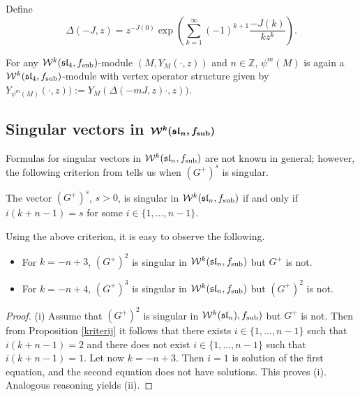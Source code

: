 Define
 \[
 \Delta (-J,z) = z^{-J(0)}\exp \left ( \sum _{k=1} ^{\infty} (-1)^{k+1}\frac{-J(k)}{kz^k}\right ).
 \]

For any $\mathcal{W}^k(\mathfrak{sl}_4, f_{\rm sub})$-module $(M, Y_M(\cdot, z))$ and $n \in \mathbb{Z}$,
$\psi^m (M)$ is again a $\mathcal{W}^k(\mathfrak{sl}_4, f_{\rm sub})$-module with vertex operator structure given by
$ Y_{\psi^m (M) } ( \cdot , z)) := Y_{ M } (\Delta ( -m J, z) \cdot , z))$.

\subsection[Singular vectors in W\^{}k(sl\_n, f\_sub)]{Singular vectors in $\boldsymbol{\mathcal{W}^k(\mathfrak{sl}_n, f_{\rm sub})}$}
	
	Formulas for singular vectors in $\mathcal{W}^k(\mathfrak{sl}_n, f_{\rm sub})$ are not known in general; however, the following criterion from \cite{Feh} tells us when $(G^+)^s$ is singular.
	
	\begin{Proposition}\label{kriterij}
		The vector $(G^+)^s$, $s>0$, is singular in $\mathcal{W}^k(\mathfrak{sl}_n, f_{\rm sub})$ if and only if~${
		 	i(k+n-1)=s}
$
 for some $i \in \{1,\dots ,n-1 \}$.
	\end{Proposition}

Using the above criterion, it is easy to observe the following.
	\begin{Lemma} \label{sing_G^+}\qquad
	\begin{itemize}\itemsep=0pt
		\item[$(i)$] For $k=-n+3$, $(G^+)^2$ is singular in $\mathcal{W}^k(\mathfrak{sl}_n, f_{\rm sub})$ but $G^+$ is not.
		\item[$(ii)$] For $k=-n+4$, $(G^+)^3$ is singular in $\mathcal{W}^k(\mathfrak{sl}_n, f_{\rm sub})$ but $(G^+)^2$ is not.	
	\end{itemize}
	\end{Lemma}
	
	\begin{proof}
		(i) Assume that $(G^+)^2$ is singular in $\mathcal{W}^k(\mathfrak{sl}_n), f_{\rm sub})$ but $G^+$ is not. Then from Proposition \ref{kriterij} it follows that there exists $i \in \{1,\dots ,n-1 \}$ such that $ i(k+n-1)=2 $ and there does not exist $i \in \{1,\dots ,n-1 \}$ such that $ i(k+n-1)=1$. Let now $k=-n+3$. Then $i=1$ is solution of the first equation, and the second equation does not have solutions. This proves (i).
		Analogous reasoning yields (ii).
	\end{proof}
